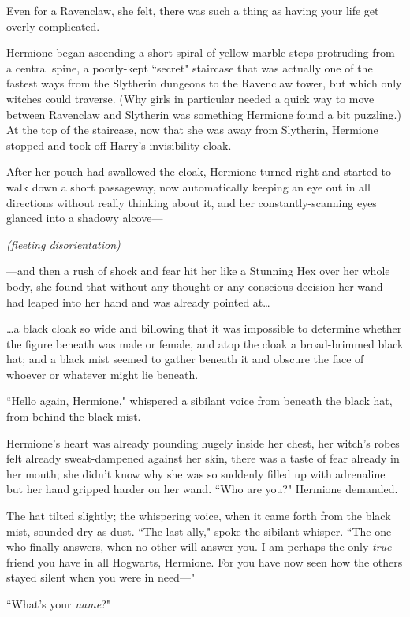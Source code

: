 Even for a Ravenclaw, she felt, there was such a thing as having your life get overly complicated.

Hermione began ascending a short spiral of yellow marble steps protruding from a central spine, a poorly-kept ``secret" staircase that was actually one of the fastest ways from the Slytherin dungeons to the Ravenclaw tower, but which only witches could traverse. (Why girls in particular needed a quick way to move between Ravenclaw and Slytherin was something Hermione found a bit puzzling.) At the top of the staircase, now that she was away from Slytherin, Hermione stopped and took off Harry's invisibility cloak.

After her pouch had swallowed the cloak, Hermione turned right and started to walk down a short passageway, now automatically keeping an eye out in all directions without really thinking about it, and her constantly-scanning eyes glanced into a shadowy alcove---

\emph{(fleeting disorientation)}

---and then a rush of shock and fear hit her like a Stunning Hex over her whole body, she found that without any thought or any conscious decision her wand had leaped into her hand and was already pointed at{\ldots}

{\ldots}a black cloak so wide and billowing that it was impossible to determine whether the figure beneath was male or female, and atop the cloak a broad-brimmed black hat; and a black mist seemed to gather beneath it and obscure the face of whoever or whatever might lie beneath.

``Hello again, Hermione," whispered a sibilant voice from beneath the black hat, from behind the black mist.

Hermione's heart was already pounding hugely inside her chest, her witch's robes felt already sweat-dampened against her skin, there was a taste of fear already in her mouth; she didn't know why she was so suddenly filled up with adrenaline but her hand gripped harder on her wand. ``Who are you?" Hermione demanded.

The hat tilted slightly; the whispering voice, when it came forth from the black mist, sounded dry as dust. ``The last ally," spoke the sibilant whisper. ``The one who finally answers, when no other will answer you. I am perhaps the only \emph{true} friend you have in all Hogwarts, Hermione. For you have now seen how the others stayed silent when you were in need---"

``What's your \emph{name}?"

